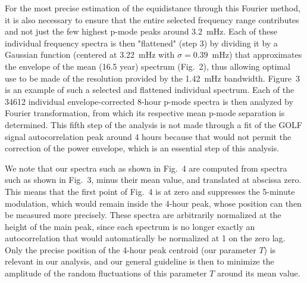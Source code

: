 \documentclass[bibyear]{aa}
\begin{document}
For the most precise estimation of the equidistance through this Fourier method, it is also necessary to ensure that the entire selected frequency range contributes and not just the few highest p-mode peaks around 3.2~mHz. Each of these individual frequency spectra is then "flattened" (step 3) by dividing it by a Gaussian function (centered at 3.22~mHz with $\sigma= 0.39$~mHz) that approximates the envelope of the mean (16.5 year) spectrum (Fig.~2), thus allowing optimal use to be made of the resolution provided by the 1.42~mHz bandwidth. Figure~3 is an example of such a selected and flattened individual spectrum.  
Each of the 34612 individual envelope-corrected 8-hour p-mode spectra is then analyzed by Fourier transformation, from which its respective mean p-mode separation is determined.
This fifth step of the analysis is not made through a fit of the GOLF signal autocorrelation peak around 4 hours because that would not permit the correction of the power envelope, which is an essential step of this analysis. 




We note that our spectra such as shown in Fig.~4 are computed from spectra such as shown in Fig.~3, minus their mean value, and translated at abscissa zero. This means that the first point of Fig.~4 is at zero and suppresses the 5-minute modulation,
which would remain inside the 4-hour peak, whose position can then be measured more precisely. These spectra are arbitrarily normalized at the height of the main peak, since each spectrum is no longer exactly an autocorrelation that would automatically be normalized at 1 on the zero lag. Only the precise position of the 4-hour peak centroid (our parameter $T$) is relevant in our analysis, and our general guideline is then to minimize the amplitude of the random fluctuations of this parameter $T$ around its mean value.  
\end{document}
